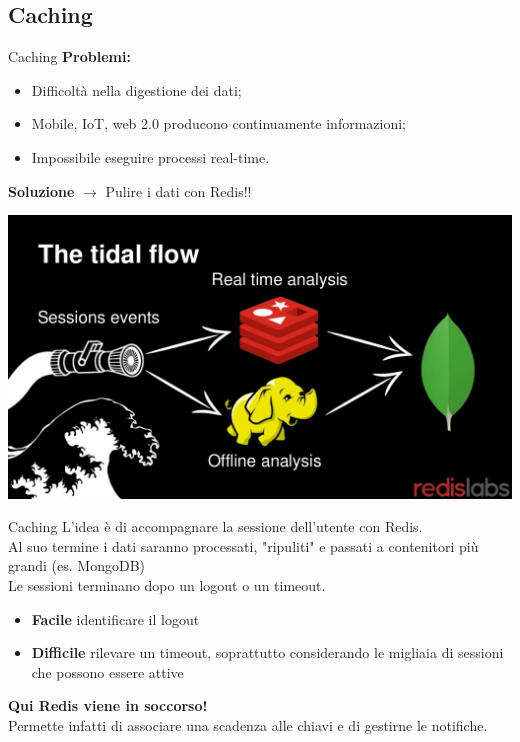 \documentclass[xcolor=dvipsnames]{beamer}
\begin{document}
  \subsection{Caching}
    \begin{frame}{Caching}
      \textbf{Problemi:}
        \begin{itemize}
          \item Difficoltà nella digestione dei dati;
          \item Mobile, IoT, web 2.0 producono continuamente informazioni;
          \item Impossibile eseguire processi real-time.
        \end{itemize}

      \textbf{Soluzione} $\rightarrow$ Pulire i dati con Redis!!
      \begin{center}
      \includegraphics[height=4.cm]{res/realTimeRedis.jpg}
      \end{center}
    \end{frame}

    \begin{frame}{Caching}
      L'idea è di accompagnare la sessione dell'utente con Redis.
      \\
      Al suo termine i dati saranno processati, "ripuliti" e passati a contenitori più grandi (es. MongoDB) \\
      Le sessioni terminano dopo un logout o un timeout.
      \begin{itemize}
        \item \textbf{Facile} identificare il logout
        \item \textbf{Difficile} rilevare un timeout, soprattutto considerando le migliaia di sessioni che possono essere attive
      \end{itemize}
      \bigskip
      \textbf{Qui Redis viene in soccorso!}
      \\
      Permette infatti di associare una scadenza alle chiavi e di gestirne le notifiche.
    \end{frame}
\end{document}
